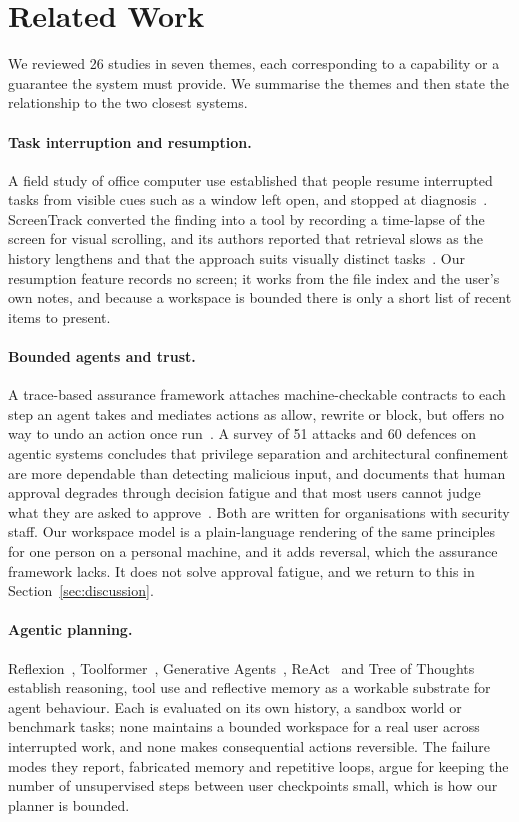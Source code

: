 \section{Related Work}
\label{sec:related}

We reviewed 26 studies in seven themes, each corresponding to a capability or a guarantee the system must provide. We summarise the themes and then state the relationship to the two closest systems.

\paragraph{Task interruption and resumption.}
A field study of office computer use established that people resume interrupted tasks from visible cues such as a window left open, and stopped at diagnosis~\cite{iqbal2007disruption}. ScreenTrack converted the finding into a tool by recording a time-lapse of the screen for visual scrolling, and its authors reported that retrieval slows as the history lengthens and that the approach suits visually distinct tasks~\cite{hu2020screentrack}. Our resumption feature records no screen; it works from the file index and the user's own notes, and because a workspace is bounded there is only a short list of recent items to present.

\paragraph{Bounded agents and trust.}
A trace-based assurance framework attaches machine-checkable contracts to each step an agent takes and mediates actions as allow, rewrite or block, but offers no way to undo an action once run~\cite{paduraru2026tracebased}. A survey of 51 attacks and 60 defences on agentic systems concludes that privilege separation and architectural confinement are more dependable than detecting malicious input, and documents that human approval degrades through decision fatigue and that most users cannot judge what they are asked to approve~\cite{kim2026attackdefense}. Both are written for organisations with security staff. Our workspace model is a plain-language rendering of the same principles for one person on a personal machine, and it adds reversal, which the assurance framework lacks. It does not solve approval fatigue, and we return to this in Section~\ref{sec:discussion}.

\paragraph{Agentic planning.}
Reflexion~\cite{shinn2023reflexion}, Toolformer~\cite{schick2023toolformer}, Generative Agents~\cite{park2023generative}, ReAct~\cite{yao2023react} and Tree of Thoughts~\cite{yao2023tot} establish reasoning, tool use and reflective memory as a workable substrate for agent behaviour. Each is evaluated on its own history, a sandbox world or benchmark tasks; none maintains a bounded workspace for a real user across interrupted work, and none makes consequential actions reversible. The failure modes they report, fabricated memory and repetitive loops, argue for keeping the number of unsupervised steps between user checkpoints small, which is how our planner is bounded.

